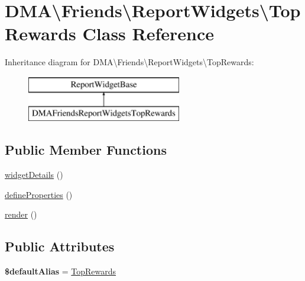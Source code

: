 \hypertarget{classDMA_1_1Friends_1_1ReportWidgets_1_1TopRewards}{}\section{D\+M\+A\textbackslash{}Friends\textbackslash{}Report\+Widgets\textbackslash{}Top\+Rewards Class Reference}
\label{classDMA_1_1Friends_1_1ReportWidgets_1_1TopRewards}
Inheritance diagram for D\+M\+A\textbackslash{}Friends\textbackslash{}Report\+Widgets\textbackslash{}Top\+Rewards\+:\begin{figure}[H]
\begin{center}
\leavevmode
\includegraphics[height=2.000000cm]{d8/db3/classDMA_1_1Friends_1_1ReportWidgets_1_1TopRewards}
\end{center}
\end{figure}
\subsection*{Public Member Functions}
\begin{DoxyCompactItemize}
\item 
\hyperlink{classDMA_1_1Friends_1_1ReportWidgets_1_1TopRewards_ae3d8d1fcd25016f4232b6c965be611c5}{widget\+Details} ()
\item 
\hyperlink{classDMA_1_1Friends_1_1ReportWidgets_1_1TopRewards_a182c195bbe5766e556e5a11a26aebd7b}{define\+Properties} ()
\item 
\hyperlink{classDMA_1_1Friends_1_1ReportWidgets_1_1TopRewards_ab25e73c885c18caacd88320a748b1547}{render} ()
\end{DoxyCompactItemize}
\subsection*{Public Attributes}
\begin{DoxyCompactItemize}
\item 
\hypertarget{classDMA_1_1Friends_1_1ReportWidgets_1_1TopRewards_a9c1bd5a3cd12153d2fbba5ff75777c43}{}{\bfseries \$default\+Alias} = \textquotesingle{}\hyperlink{classDMA_1_1Friends_1_1ReportWidgets_1_1TopRewards}{Top\+Rewards}\textquotesingle{}\label{classDMA_1_1Friends_1_1ReportWidgets_1_1TopRewards_a9c1bd5a3cd12153d2fbba5ff75777c43}

\end{DoxyCompactItemize}


